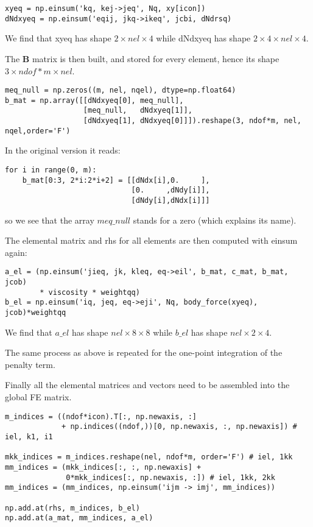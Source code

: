 \begin{lstlisting}
xyeq = np.einsum('kq, kej->jeq', Nq, xy[icon])
dNdxyeq = np.einsum('eqij, jkq->ikeq', jcbi, dNdrsq)
\end{lstlisting}
We find that xyeq has shape $2\times nel \times 4$
while dNdxyeq has shape $2\times 4\times nel\times 4$.

The ${\bm B}$ matrix is then built, and stored for every element, 
hence its shape $3 \times ndof*m \times nel$.

\begin{lstlisting}
meq_null = np.zeros((m, nel, nqel), dtype=np.float64)
b_mat = np.array([[dNdxyeq[0], meq_null],
                  [meq_null,   dNdxyeq[1]],
                  [dNdxyeq[1], dNdxyeq[0]]]).reshape(3, ndof*m, nel, nqel,order='F')
\end{lstlisting}
In the original version it reads:
\begin{lstlisting}
for i in range(0, m):
    b_mat[0:3, 2*i:2*i+2] = [[dNdx[i],0.     ],
                             [0.     ,dNdy[i]],
                             [dNdy[i],dNdx[i]]]
\end{lstlisting}
so we see that the array $meq\_null$ stands for a zero (which explains its name).

The elemental matrix and rhs for all elements are then computed with einsum again:
\begin{lstlisting}
a_el = (np.einsum('jieq, jk, kleq, eq->eil', b_mat, c_mat, b_mat, jcob)
        * viscosity * weightqq)
b_el = np.einsum('iq, jeq, eq->eji', Nq, body_force(xyeq), jcob)*weightqq
\end{lstlisting}
We find that $a\_el$ has shape $nel\times8 \times 8$ while
$b\_el$ has shape $nel\times 2\times4$.

The same process as above is repeated for the one-point integration of the 
penalty term. 

Finally all the elemental matrices and vectors need to be assembled into 
the global FE matrix. 

\begin{lstlisting}
m_indices = ((ndof*icon).T[:, np.newaxis, :]
             + np.indices((ndof,))[0, np.newaxis, :, np.newaxis]) # iel, k1, i1

mkk_indices = m_indices.reshape(nel, ndof*m, order='F') # iel, 1kk
mm_indices = (mkk_indices[:, :, np.newaxis] +
              0*mkk_indices[:, np.newaxis, :]) # iel, 1kk, 2kk
mm_indices = (mm_indices, np.einsum('ijm -> imj', mm_indices))

np.add.at(rhs, m_indices, b_el)
np.add.at(a_mat, mm_indices, a_el)
\end{lstlisting}

















